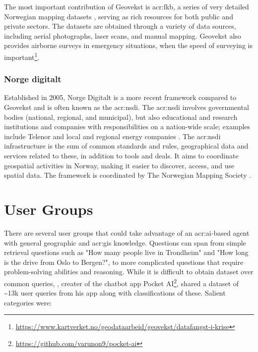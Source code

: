 The most important contribution of Geovekst is \gls{acr:fkb}, a series of very detailed Norwegian mapping datasets , serving as rich resources for both public and private sectors. The datasets are obtained through a variety of data sources, including aerial photographs, laser scans, and manual mapping. Geovekst also provides airborne surveys in emergency situations, when the speed of surveying is important\footnote{\url{https://www.kartverket.no/geodataarbeid/geovekst/datafangst-i-krise}}.

\subsubsection{Norge digitalt}\label{subsubsec:norge-digitalt}

Established in 2005, Norge Digitalt is a more recent framework compared to Geovekst and is often known as the \gls{acr:nsdi}. The \gls{acr:nsdi} involves governmental bodies (national, regional, and municipal), but also educational and research institutions and companies with responsibilities on a nation-wide scale; examples include Telenor and local and regional energy companies \citep[6]{norgedigitaltGenerelleVilkarNorge2023}. The \gls{acr:nsdi} infrastructure is the sum of common standards and rules, geographical data and services related to these, in addition to tools and deals. It aims to coordinate geospatial activities in Norway, making it easier to discover, access, and use spatial data. The framework is coordinated by The Norwegian Mapping Society \citep{norgedigitaltGenerelleVilkarNorge2023}.



\section{User Groups}\label{sec:user-groups}

There are several user groups that could take advantage of an \acrshort{acr:ai}-based agent with general geographic and \acrshort{acr:gis} knowledge. Questions can span from simple retrieval questions such as "How many people live in Trondheim" and "How long is the drive from Oslo to Bergen?", to more complicated questions that require problem-solving abilities and reasoning. While it is difficult to obtain dataset over common queries, \cite{kumarWhatArePeople2023a}, creater of the chatbot app Pocket AI\footnote{\url{https://github.com/varunon9/pocket-ai}}, shared a dataset of \textasciitilde 13k user queries from his app along with classifications of these. Salient categories were:

